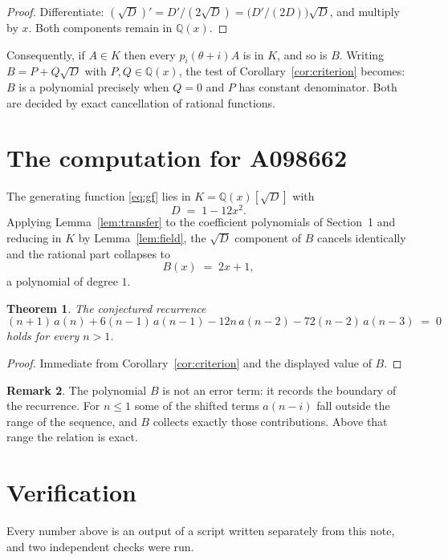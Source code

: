 \documentclass[11pt,a4paper]{article}
\theoremstyle{plain}
\newtheorem{theorem}{Theorem}
\theoremstyle{definition}
\newtheorem{remark}[theorem]{Remark}
\begin{document}
\begin{proof}
Differentiate: $(\sqrt{D})'=D'/(2\sqrt{D})=\bigl(D'/(2D)\bigr)\sqrt{D}$, and multiply by
$x$. Both components remain in $\mathbb{Q}(x)$.
\end{proof}

Consequently, if $A\in K$ then every $p_{i}(\theta+i)A$ is in $K$, and so is $B$. Writing
$B=P+Q\sqrt{D}$ with $P,Q\in\mathbb{Q}(x)$, the test of Corollary~\ref{cor:criterion}
becomes: $B$ is a polynomial precisely when $Q=0$ and $P$ has constant denominator. Both
are decided by exact cancellation of rational functions.

\section{The computation for A098662}

The generating function \eqref{eq:gf} lies in $K=\mathbb{Q}(x)[\sqrt{D}]$ with
\[
D \;=\; 1 - 12 x^{2} .
\]
Applying Lemma~\ref{lem:transfer} to the coefficient polynomials of Section~1 and reducing
in $K$ by Lemma~\ref{lem:field}, the $\sqrt{D}$ component of $B$ cancels identically and
the rational part collapses to
\[
B(x)\;=\;2 x + 1 ,
\]
a polynomial of degree $1$.

\begin{theorem}
The conjectured recurrence
\[
(n + 1)\,a(n) + 6 \left(n - 1\right)\,a(n-1) -  12 n\,a(n-2) -  72 \left(n - 2\right)\,a(n-3) \;=\;0
\]
holds for every $n>1$.
\end{theorem}

\begin{proof}
Immediate from Corollary~\ref{cor:criterion} and the displayed value of $B$.
\end{proof}

\begin{remark}
The polynomial $B$ is not an error term: it records the boundary of the recurrence. For
$n\le1$ some of the shifted terms $a(n-i)$ fall outside the range of the sequence,
and $B$ collects exactly those contributions. Above that range the relation is exact.
\end{remark}

\section{Verification}

Every number above is an output of a script written separately from this note, and two
independent checks were run.
\end{document}
